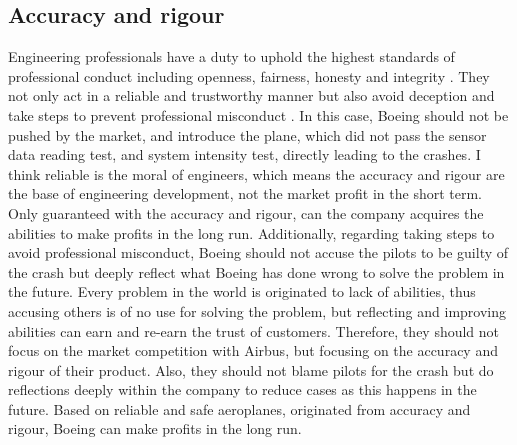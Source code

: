 \documentclass{article}
\begin{document}
\subsection{Accuracy and rigour}
Engineering professionals have a duty to uphold the highest
standards of professional conduct including openness, fairness,
honesty and integrity \cite{statemen88:online}. They not only act in a reliable and trustworthy manner but also avoid deception and take steps to prevent professional misconduct \cite{statemen88:online}. In this case, Boeing should not be pushed by the market, and introduce the plane, which did not pass the sensor data reading test, and system intensity test, directly leading to the crashes. I think reliable is the moral of engineers, which means the accuracy and rigour are the base of engineering development, not the market profit in the short term. Only guaranteed with the accuracy and rigour, can the company acquires the abilities to make profits in the long run. Additionally, regarding taking steps to avoid professional misconduct, Boeing should not accuse the pilots to be guilty of the crash but deeply reflect what Boeing has done wrong to solve the problem in the future. Every problem in the world is originated to lack of abilities, thus accusing others is of no use for solving the problem, but reflecting and improving abilities can earn and re-earn the trust of customers. Therefore, they should not focus on the market competition with Airbus, but focusing on the accuracy and rigour of their product. Also, they should not blame pilots for the crash but do reflections deeply within the company to reduce cases as this happens in the future.  Based on reliable and safe aeroplanes, originated from accuracy and rigour, Boeing can make profits in the long run. 
\end{document}
